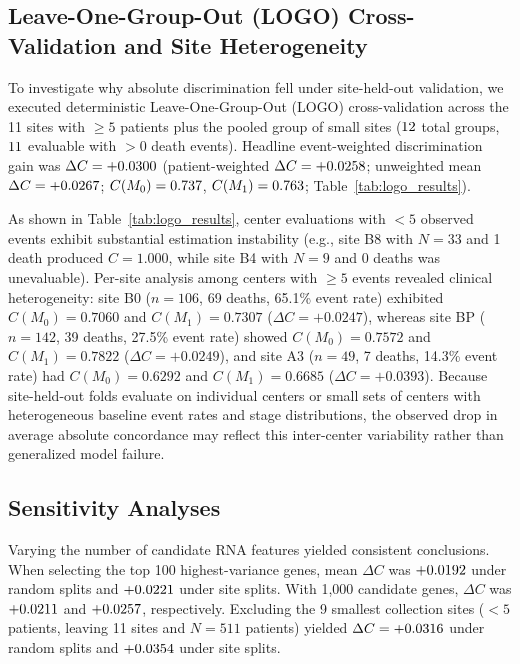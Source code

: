 \documentclass{article}
\begin{document}
\subsection{Leave-One-Group-Out (LOGO) Cross-Validation and Site Heterogeneity}
To investigate why absolute discrimination fell under site-held-out validation, we executed deterministic Leave-One-Group-Out (LOGO) cross-validation across the 11 sites with $\ge 5$ patients plus the pooled group of small sites ($12$ total groups, $11$ evaluable with $>0$ death events). Headline event-weighted discrimination gain was $\Delta C = +0.0300$ (patient-weighted $\Delta C = +0.0258$; unweighted mean $\Delta C = +0.0267$; $C(M_0) = 0.737$, $C(M_1) = 0.763$; Table~\ref{tab:logo_results}).

As shown in Table~\ref{tab:logo_results}, center evaluations with $<5$ observed events exhibit substantial estimation instability (e.g., site B8 with $N=33$ and 1 death produced $C=1.000$, while site B4 with $N=9$ and 0 deaths was unevaluable). Per-site analysis among centers with $\ge 5$ events revealed clinical heterogeneity: site B0 ($n = 106$, 69 deaths, 65.1\% event rate) exhibited $C(M_0) = 0.7060$ and $C(M_1) = 0.7307$ ($\Delta C = +0.0247$), whereas site BP ($n = 142$, 39 deaths, 27.5\% event rate) showed $C(M_0) = 0.7572$ and $C(M_1) = 0.7822$ ($\Delta C = +0.0249$), and site A3 ($n = 49$, 7 deaths, 14.3\% event rate) had $C(M_0) = 0.6292$ and $C(M_1) = 0.6685$ ($\Delta C = +0.0393$). Because site-held-out folds evaluate on individual centers or small sets of centers with heterogeneous baseline event rates and stage distributions, the observed drop in average absolute concordance may reflect this inter-center variability rather than generalized model failure.



\subsection{Sensitivity Analyses}
Varying the number of candidate RNA features yielded consistent conclusions. When selecting the top 100 highest-variance genes, mean $\Delta C$ was $+0.0192$ under random splits and $+0.0221$ under site splits. With 1,000 candidate genes, $\Delta C$ was $+0.0211$ and $+0.0257$, respectively. Excluding the 9 smallest collection sites ($<5$ patients, leaving 11 sites and $N = 511$ patients) yielded $\Delta C = +0.0316$ under random splits and $+0.0354$ under site splits.
\end{document}
